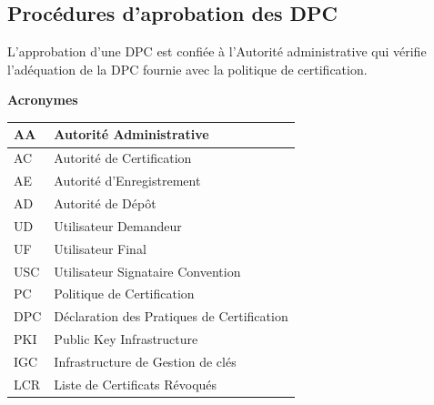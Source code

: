 \documentclass[a4paper,11pt,french]{article}
\begin{document}
\subsection{Procédures d'aprobation des DPC}
L’approbation d’une DPC est confiée à l’Autorité administrative qui vérifie l’adéquation de la DPC fournie avec la politique de certification.

\newpage
\textbf {Acronymes}


\begin{tabular}{|l|p{10cm}|}
\hline
AA  & Autorité Administrative
\\
\hline
AC & Autorité de Certification
\\
\hline
AE  & Autorité d'Enregistrement 
\\
\hline
AD  & Autorité de Dépôt
\\
\hline
UD  & Utilisateur Demandeur 
\\
\hline
UF & Utilisateur Final
\\
\hline
USC &  Utilisateur Signataire Convention
\\
\hline
PC & Politique de Certification
\\
\hline
DPC & Déclaration des Pratiques de Certification
\\
\hline
PKI & Public Key Infrastructure
\\
\hline
IGC & Infrastructure de Gestion de clés
\\
\hline
LCR & Liste de Certificats Révoqués
\\
\hline

\end{tabular}
\end{document}
